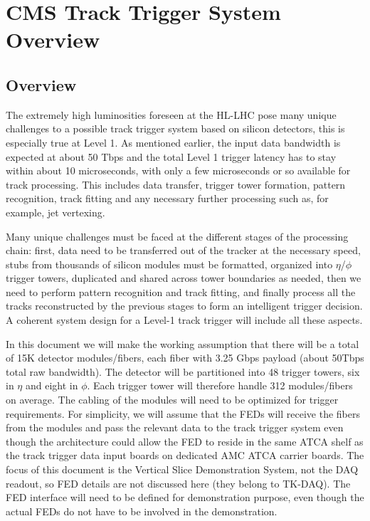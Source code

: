 \section{CMS Track Trigger System Overview}

\subsection{Overview}

\noindent The extremely high luminosities foreseen at the HL-LHC pose many unique challenges to a possible track trigger system based on silicon detectors, this is especially true at Level 1. As mentioned earlier, the input data bandwidth is expected at about 50 Tbps and the total Level 1 trigger latency has to stay within about 10 microseconds, with only a few microseconds or so available for track processing. This includes data transfer, trigger tower formation, pattern recognition, track fitting and any necessary further processing such as, for example, jet vertexing. 

\noindent Many unique challenges must be faced at the different stages of the processing chain: first, data need to be transferred out of the tracker at the necessary speed, stubs from thousands of silicon modules must be formatted, organized into $\eta$/$\phi$ trigger towers, duplicated and shared across tower boundaries as needed, then we need to perform pattern recognition and track fitting, and finally process all the tracks reconstructed by the previous stages to form an intelligent trigger decision. A coherent system design for a Level-1 track trigger will include all these aspects.

\noindent In this document we will make the working assumption that there will be a total of 15K detector modules/fibers, each fiber with 3.25 Gbps payload (about 50Tbps total raw bandwidth). The detector will be partitioned into 48 trigger towers, six in $\eta$ and eight in $\phi$. Each trigger tower will therefore handle 312 modules/fibers on average. The cabling of the modules will need to be optimized for trigger requirements. For simplicity, we will assume that the FEDs will receive the fibers from the modules and pass the relevant data to the track trigger system even though the architecture could allow the FED to reside in the same ATCA shelf as the track trigger data input boards on dedicated AMC ATCA carrier boards. The focus of this document is the Vertical Slice Demonstration System, not the DAQ readout, so FED details are not discussed here (they belong to TK-DAQ). The FED interface will need to be defined for demonstration purpose, even though the actual FEDs do not have to be involved in the demonstration.

